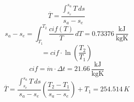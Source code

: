 

\item[(b)] 
    \[
    \overline{T} = \frac{\int_{s_e}^{s_a} T \, ds}{s_a - s_e}
    \]
    \[
    s_a - s_e = \int_{T_1}^{T_2} \frac{cif(T)}{T} \, dT = 0.73376 \, \frac{\text{kJ}}{\text{kgK}}
    \]
    \[
    = cif \cdot \ln \left( \frac{T_2}{T_1} \right)
    \]
    \[
    cif = \dot{m} \cdot \Delta t = 21.66 \, \frac{\text{kJ}}{\text{kgK}}
    \]
    \[
    \overline{T} = \frac{\int_{s_e}^{s_a} T \, ds}{s_a - s_e} \left( \frac{T_2 - T_1}{s_a - s_e} \right) + T_1 = 254.514 \, K
    \]